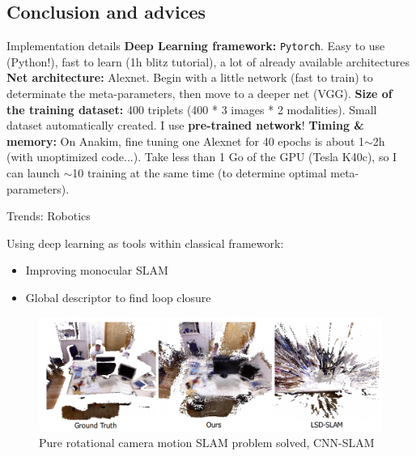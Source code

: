 \subsection{Conclusion and advices}

\label{sec:results}

\begin{frame}{Implementation details}
	\vfill	
	\textbf{Deep Learning framework:} \texttt{Pytorch}. Easy to use (Python!), fast to learn (1h blitz tutorial), a lot of already available architectures
	\vfill
	\textbf{Net architecture:} Alexnet. Begin with a little network (fast to train) to determinate the meta-parameters, then move to a deeper net (VGG).
	\vfill
	\textbf{Size of the training dataset:} 400 triplets (400 * 3 images * 2 modalities). Small dataset automatically created. I use \textbf{pre-trained network}!
	\vfill
	\textbf{Timing \& memory:} On Anakim, fine tuning one Alexnet for 40 epochs is about 1$\sim$2h	(with unoptimized code...). Take less than 1 Go of the GPU (Tesla K40c), so I can launch $\sim$10 training at the same time (to determine optimal meta-parameters).
	\vfill
\end{frame}

\begin{frame}{Trends: Robotics}

	Using deep learning as tools within classical framework:
	\begin{itemize}
		\item Improving monocular SLAM
		\item Global descriptor to find loop closure
	\end{itemize}
	\begin{figure}
		\includegraphics[width=0.9\linewidth]{images/cnnslam.png}
		\caption{Pure rotational camera motion SLAM problem solved, CNN-SLAM~\cite{POINTNET}}
	\end{figure}
	
\end{frame}


